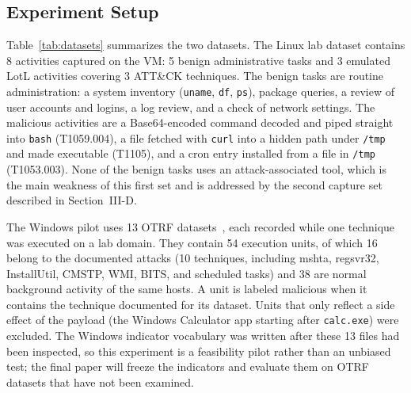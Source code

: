 \documentclass[conference]{IEEEtran}
\newcommand{\LinTotal}{8}
\newcommand{\LinBenign}{5}
\newcommand{\LinMal}{3}
\newcommand{\LinTech}{3}
\newcommand{\WinTotal}{54}
\newcommand{\WinBenign}{38}
\newcommand{\WinMal}{16}
\newcommand{\WinTech}{10}
\begin{document}
\subsection{Experiment Setup}
\begin{table}[t]
\caption{Datasets}\label{tab:datasets}\centering\footnotesize
{}\end{table}
Table~\ref{tab:datasets} summarizes the two datasets. The Linux lab dataset
contains \LinTotal{} activities captured on the VM: \LinBenign{} benign
administrative tasks and \LinMal{} emulated LotL activities covering
\LinTech{} ATT\&CK techniques. The benign tasks are routine administration:
a system inventory (\texttt{uname}, \texttt{df}, \texttt{ps}), package
queries, a review of user accounts and logins, a log review, and a check of
network settings. The malicious activities are a Base64-encoded command
decoded and piped straight into \texttt{bash} (T1059.004), a file fetched
with \texttt{curl} into a hidden path under \texttt{/tmp} and made executable
(T1105), and a cron entry installed from a file in \texttt{/tmp}
(T1053.003). None of the benign tasks uses an attack-associated tool, which
is the main weakness of this first set and is addressed by the second
capture set described in Section~III-D.

The Windows pilot uses 13 OTRF datasets~\cite{otrf2020datasets}, each
recorded while one technique was executed on a lab domain. They contain
\WinTotal{} execution units, of which \WinMal{} belong to the documented
attacks (\WinTech{} techniques, including mshta, regsvr32, InstallUtil,
CMSTP, WMI, BITS, and scheduled tasks) and \WinBenign{} are normal background
activity of the same hosts. A unit is labeled malicious when it contains the
technique documented for its dataset. Units that only reflect a side effect
of the payload (the Windows Calculator app starting after \texttt{calc.exe})
were excluded. The Windows indicator vocabulary was written after these 13
files had been inspected, so this experiment is a feasibility pilot rather
than an unbiased test; the final paper will freeze the indicators and
evaluate them on OTRF datasets that have not been examined.
\end{document}
